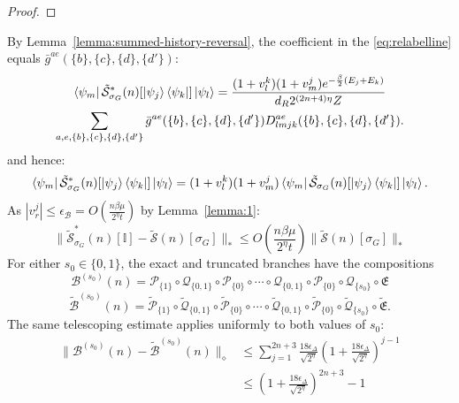 \documentclass[aps,floatfix,10pt,amssymb,amsfont,amsmath,superscriptaddress,float,nofootinbib,longbibliography,nobalancelastpage,twocolumn]{revtex4-2}
\begin{document}
\begin{widetext}
\begin{proof}
\end{proof}
By Lemma~\ref{lemma:summed-history-reversal}, the coefficient in the \eqref{eq:relabelline} equals $\bar g^{ae}(\{b\},\{c\},\{d\},\{d'\})$:
\begin{multline}
     \bra{\psi_m}\tilde{\mathcal{S}}^*_{\sigma_G}(n)[\ket{\psi_j}\bra{\psi_k}]\ket{\psi_l} = \frac{(1+v_l^k)(1+v_m^j)e^{-\frac{\beta}{2}(E_j+E_k)}}{d_R2^{(2n+4)\eta}Z}\\\sum_{a,e,\{b\},\{c\},\{d\},\{d'\}} \bar{g}^{ae}(\{b\},\{c\},\{d\},\{d'\}) D^{ae}_{lmjk}(\{b\},\{c\},\{d\},\{d'\}).
     \label{eq:relabelline-symmetrized}
\end{multline}
and hence:
\begin{equation}
    \bra{\psi_m}\tilde{\mathcal{S}}^*_{\sigma_G}(n)[\ket{\psi_j}\bra{\psi_k}]\ket{\psi_l}
    =(1+v_l^k)(1+v_m^j)\bra{\psi_m}\tilde{\mathcal{S}}_{\sigma_G}(n)[\ket{\psi_j}\bra{\psi_k}]\ket{\psi_l}.
\end{equation}
As $|v_r^j| \leq \epsilon_{\mathcal{B}} = O(\frac{n\beta \mu}{2^{\eta}t})$ by Lemma~\ref{lemma:1}:
\begin{equation}
    \|\tilde{\mathcal{S}}^*_{\sigma_G}(n)[\mathbb{I}] - \tilde{\mathcal{S}}(n)[\sigma_G]\|_* \leq O\left(\frac{n\beta \mu}{2^{\eta}t}\right)\|\tilde{\mathcal{S}}(n)[\sigma_G]\|_*
    \label{eq:Boutput}
\end{equation}
For either $s_0\in\{0,1\}$, the exact and truncated branches have the
compositions
\begin{equation}
    \mathcal{B}^{(s_0)}(n) = \mathcal{P}_{\{1\}}\circ\mathcal{Q}_{\{0,1\}}\circ\mathcal{P}_{\{0\}}\circ\cdots\circ\mathcal{Q}_{\{0,1\}}\circ\mathcal{P}_{\{0\}}\circ\mathcal{Q}_{\{s_0\}}\circ\mathfrak{E}
\end{equation}
\begin{equation}
    \tilde{\mathcal{B}}^{(s_0)}(n) = \tilde{\mathcal{P}}_{\{1\}}\circ\tilde {\mathcal{Q}}_{\{0,1\}}\circ\tilde{\mathcal{P}}_{\{0\}}\circ\cdots\circ\tilde{\mathcal{Q}}_{\{0,1\}}\circ\tilde{\mathcal{P}}_{\{0\}}\circ\tilde{\mathcal{Q}}_{\{s_0\}}\circ\tilde{\mathfrak{E}}.
\end{equation}
The same telescoping estimate applies uniformly to both values of $s_0$:
\begin{align}
    \|\mathcal{B}^{(s_0)}(n)-\tilde{\mathcal{B}}^{(s_0)}(n)\|_{\diamond}
    &\leq  \sum_{j=1}^{2n+3}\frac{18\epsilon_{\Delta}}{\sqrt{2^{\eta}}}\left(1+\frac{18\epsilon_{\Delta}}{\sqrt{2^{\eta}}}\right)^{j-1}\\
    &\leq  (1+\frac{18\epsilon_{\Delta}}{\sqrt{2^{\eta}}})^{2n+3}-1\\

\end{align}
\end{widetext}
\end{document}
